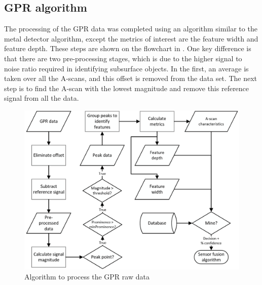 \documentclass[main.tex]{subfiles}
\begin{document}

\subsection{GPR algorithm}
The processing of the GPR data was completed using an algorithm similar to the metal detector algorithm, except the metrics of interest are the feature width and feature depth. These steps are shown on the flowchart in . One key difference is that there are two pre-processing stages, which is due to the higher signal to noise ratio required in identifying subsurface objects. In the first, an average is taken over all the A-scans, and this offset is removed from the data set. The next step is to find the A-scan with the lowest magnitude and remove this reference signal from all the data.

\begin{figure}[ht]
\includegraphics[width=\textwidth]{4-DetailedDesign/GPRflow.PNG}
\centering
\caption{Algorithm to process the GPR raw data}
\end{figure}
\end{document}
